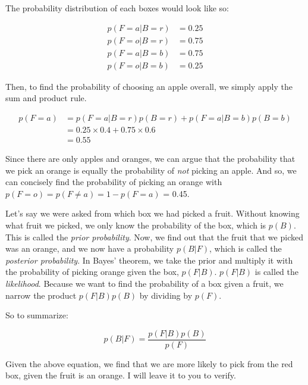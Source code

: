 \documentclass{tufte-handout}
\begin{document}
The probability distribution of each boxes would look like so:

\begin{align}
  p(F = a | B = r) &= 0.25 \\
  p(F = o | B = r) &= 0.75 \\
  p(F = a | B = b) &= 0.75 \\
  p(F = o | B = b) &= 0.25
\end{align}

Then, to find the probability of choosing an apple overall, we simply apply the
sum and product rule.

\begin{equation}
  \begin{aligned}
    p(F = a) &= p(F = a|B = r)p(B = r) + p(F = a|B = b)p(B = b)\\
             &= 0.25 \times 0.4 + 0.75 \times 0.6 \\
             &= 0.55
  \end{aligned}
\end{equation}

Since there are only apples and oranges, we can argue that the probability that
we pick an orange is equally the probability of \emph{not} picking an apple. And
so, we can concisely find the probability of picking an orange with
$p(F = o) = p(F \neq a) = 1 - p(F = a)$ = 0.45.

Let's say we were asked from which box we had picked a fruit. Without knowing
what fruit we picked, we only know the probability of the box, which is $p(B)$.
This is called the \emph{prior probability}. Now, we find out that the fruit
that we picked was an orange, and we now have a probability $p(B|F)$, which is
called the \emph{posterior probability}. In Bayes' theorem, we take the prior
and multiply it with the probability of picking orange given the box, $p(F|B)$.
$p(F|B)$ is called the \emph{likelihood}. Because we want to find the
probability of a box given a fruit, we narrow the product $p(F|B)p(B)$ by dividing by
$p(F)$.

So to summarize:

\begin{equation}
  p(B|F) = \frac{p(F|B)p(B)}{p(F)}
\end{equation}

Given the above equation, we find that we are more likely to pick from the red
box, given the fruit is an orange. I will leave it to you to verify.

% 
% 
\end{document}
